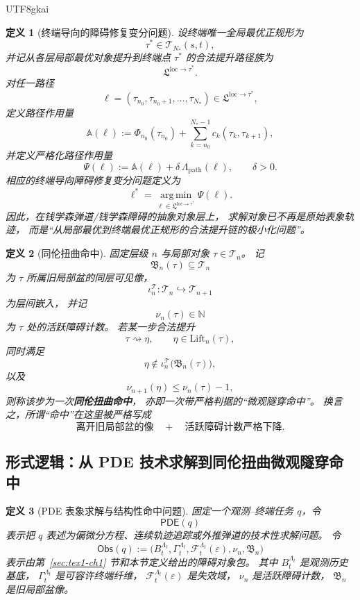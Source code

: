 \documentclass[12pt]{article}
\newtheorem{definition}{定义}[section]
\newcommand{\NN}{\mathbb{N}}
\begin{document}
\begin{CJK*}{UTF8}{gkai}
\begin{definition}[终端导向的障碍修复变分问题]
\label{def:tex1-ch5-variational}
设终端唯一全局最优正规形为
\[
  \tau^\ast\in \mathcal T_{N_\ast}(s,t),
\]
并记从各层局部最优对象提升到终端点 \(\tau^\ast\) 的合法提升路径族为
\[
  \mathfrak L^{\mathrm{loc}\to\tau^\ast}.
\]
对任一路径
\[
  \ell
  =
  (\tau_{n_0},\tau_{n_0+1},\dots,\tau_{N_\ast})
  \in
  \mathfrak L^{\mathrm{loc}\to\tau^\ast},
\]
定义路径作用量
\[
  \mathbb A(\ell)
  :=
  \Phi_{n_0}(\tau_{n_0})
  +
  \sum_{k=n_0}^{N_\ast-1} c_k(\tau_k,\tau_{k+1}),
\]
并定义严格化路径作用量
\[
  \Psi(\ell)
  :=
  \mathbb A(\ell)
  +
  \delta\,\Lambda_{\mathrm{path}}(\ell),
  \qquad \delta>0.
\]
相应的终端导向障碍修复变分问题定义为
\[
  \ell^\ast
  =
  \operatorname*{arg\,min}_{\ell\in\mathfrak L^{\mathrm{loc}\to\tau^\ast}}
  \Psi(\ell).
\]
因此，在钱学森弹道/钱学森障碍的抽象对象层上，
求解对象已不再是原始表象轨迹，
而是“从局部最优到终端最优正规形的合法提升链的极小化问题”。
\end{definition}

\begin{definition}[同伦扭曲命中]
\label{def:tex1-ch5-hit}
固定层级 \(n\) 与局部对象 \(\tau\in\mathcal T_n\)。
记
\[
  \mathfrak B_n(\tau)\subseteq \mathcal T_n
\]
为 \(\tau\) 所属旧局部盆的同层可见像，
\[
  \iota_n^{\mathcal T}:\mathcal T_n\hookrightarrow \mathcal T_{n+1}
\]
为层间嵌入，
并记
\[
  \nu_n(\tau)\in \NN
\]
为 \(\tau\) 处的活跃障碍计数。
若某一步合法提升
\[
  \tau \rightsquigarrow \eta,
  \qquad
  \eta\in \mathrm{Lift}_n(\tau),
\]
同时满足
\[
  \eta\notin \iota_n^{\mathcal T}\bigl(\mathfrak B_n(\tau)\bigr),
\]
以及
\[
  \nu_{n+1}(\eta)\le \nu_n(\tau)-1,
\]
则称该步为一次\textbf{同伦扭曲命中}，
亦即一次带严格判据的“微观隧穿命中”。
换言之，所谓“命中”在这里被严格写成
\[
  \text{离开旧局部盆的像}
  \quad+\quad
  \text{活跃障碍计数严格下降}.
\]
\end{definition}

\subsection{形式逻辑：从 PDE 技术求解到同伦扭曲微观隧穿命中}
\label{subsec:tex1-ch5-pde-to-tunnel-hit}

\begin{definition}[PDE 表象求解与结构性命中问题]
\label{def:tex1-ch5-pde-hit-problem}
固定一个观测--终端任务 \(q\)，令
\[
  \mathsf{PDE}(q)
\]
表示把 \(q\) 表述为偏微分方程、连续轨迹追踪或外推弹道的技术性求解问题。
令
\[
  \mathsf{Obs}(q)
  :=
  \bigl(
    B_t^{\Lambda_t},
    \Gamma_t^{\Lambda_t},
    \mathcal F_t^{\Lambda_t}(\varepsilon),
    \nu_n,
    \mathfrak B_n
  \bigr)
\]
表示由第~\ref{sec:tex1-ch1} 节和本节定义给出的障碍对象包。
其中 \(B_t^{\Lambda_t}\) 是观测历史基底，
\(\Gamma_t^{\Lambda_t}\) 是可容许终端纤维，
\(\mathcal F_t^{\Lambda_t}(\varepsilon)\) 是失效域，
\(\nu_n\) 是活跃障碍计数，
\(\mathfrak B_n\) 是旧局部盆像。


\end{definition}
\end{CJK*}
\end{document}
